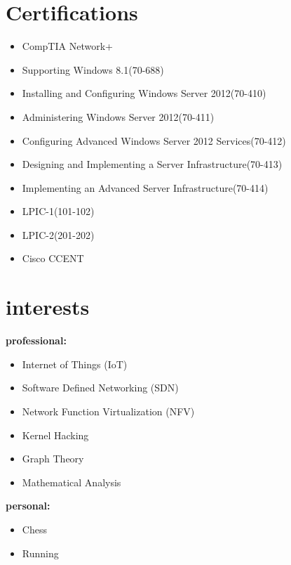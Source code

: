\documentclass[]{friggeri-cv} %
\begin{document}

\section{Certifications}
\begin{itemize}
	\item CompTIA Network+
	\item Supporting Windows 8.1(70-688)
	\item Installing and Configuring Windows Server 2012(70-410)
	\item Administering Windows Server 2012(70-411)
	\item Configuring Advanced Windows Server 2012 Services(70-412)
	\item Designing and Implementing a Server Infrastructure(70-413)
	\item Implementing an Advanced Server Infrastructure(70-414)
	\item LPIC-1(101-102)
	\item LPIC-2(201-202)
	\item Cisco CCENT
\end{itemize}



\section{interests}
\textbf{professional:}
\begin{itemize}
	\item Internet of Things (IoT)
	\item Software Defined Networking (SDN)
	\item Network Function Virtualization (NFV)
	\item Kernel Hacking
	\item Graph Theory
	\item Mathematical Analysis
\end{itemize}
\textbf{personal:}
\begin{itemize}	
	\item Chess
	\item Running
\end{itemize}
\end{document}
